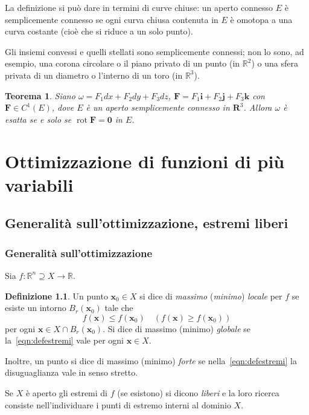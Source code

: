 \documentclass[a4paper]{book}
\DeclareMathOperator{\rot}{rot}
\numberwithin{equation}{section}
\theoremstyle{plain}
\newtheorem{teor}{Teorema}[section]
\theoremstyle{definition}
\newtheorem{defn}{Definizione}[section]
\theoremstyle{remark}
\renewcommand{\vec}{\boldsymbol}
\theoremstyle{example}
\begin{document}
La definizione si può dare in termini di curve chiuse: un aperto connesso $E$ è semplicemente connesso se ogni curva chiusa contenuta in $E$ è omotopa a una curva costante (cioè che si riduce a un solo punto).

Gli insiemi convessi e quelli stellati sono semplicemente connessi; non lo sono, ad esempio, una corona circolare o il piano privato di un punto (in $\mathbb{R}^2$) o una sfera privata di un diametro o l'interno di un toro (in $\mathbb{R}^3$).

\begin{teor}
	Siano $\omega = F_1dx + F_2 dy + F_3 dz$, $\vec{F} = F_1\vec{i} + F_2\vec{j} + F_3\vec{k}$ con $\vec{F} \in C^1(E)$, dove $E$ è un aperto semplicemente connesso in $\vec{R}^3$. Allora $\omega$ è esatta se e solo se $\rot{\vec{F}} = \vec{0}$ in $E$.
\end{teor}


\chapter{Ottimizzazione di funzioni di più variabili}
\section{Generalità sull'ottimizzazione, estremi liberi}
\subsection{Generalità sull'ottimizzazione}
Sia $f\colon \mathbb{R}^n \supseteq X \to \mathbb{R}$.
\begin{defn}
	Un punto $\vec{x}_0 \in X$ si dice di \emph{massimo} (\emph{minimo}) \emph{locale} per $f$ se esiste un intorno $B_r(\vec{x}_0)$ tale che
	\begin{equation}
		\label{eqn:defestremi}
		f(\vec{x}) \le f(\vec{x}_0) 	\quad (f(\vec{x}) \ge f(\vec{x}_0))
		\end{equation}per ogni $\vec{x} \in X \cap B_r(\vec{x}_0)$. Si dice di massimo (minimo) \emph{globale} se la~\eqref{eqn:defestremi} vale per ogni $\vec{x} \in X$.
	\end{defn}

	Inoltre, un punto si dice di massimo (minimo) \emph{forte} se nella~\eqref{eqn:defestremi} la disuguaglianza vale in senso stretto.

	Se $X$ è aperto gli estremi di $f$ (se esistono) si dicono \emph{liberi} e la loro ricerca consiste nell'individuare i punti di estremo interni al dominio $X$.
\end{document}
